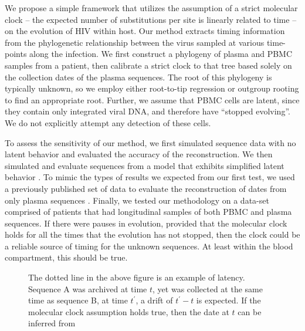 We propose a simple framework that utilizes the assumption of a strict molecular clock -- the expected number of substitutions per site is linearly related to time \citep{Ho14} --  on the evolution of HIV within host. Our method extracts timing information from the phylogenetic relationship between the virus sampled at various time-points along the infection. We first construct a phylogeny of plasma and PBMC samples from a patient, then calibrate a strict clock to that tree based solely on the collection dates of the plasma sequences. The root of this phylogeny is typically unknown, so we employ either root-to-tip regression or outgroup rooting to find an appropriate root. Further, we assume that PBMC cells are latent, since they contain only integrated viral DNA, and therefore have ``stopped evolving''. We do not explicitly attempt any detection of these cells. 

To assess the sensitivity of our method, we first simulated sequence data with no latent behavior and evaluated the accuracy of the reconstruction. We then simulated and evaluate sequences from a model that exhibits simplified latent behavior  \citep{Immonen14}. To mimic the types of results we expected from our first test, we used a previously published set of data to evaluate the reconstruction of dates from only plasma sequences \citep{McCloskey14}. Finally, we tested our methodology on a data-set comprised of patients that had longitudinal samples of both PBMC and plasma sequences.  If there were pauses in evolution, provided that the molecular clock holds for all the times that the evolution has not stopped, then the clock could be a reliable source of timing for the unknown sequences. At least within the blood compartment, this should be true. 

\begin{figure} \label{fig:latenttree}
	\centering
	\scalebox{5}{}
	\caption[Example of latent behavior]{The dotted line in the above figure is an example of latency. Sequence A was archived at time $t$, yet was collected at the same time as sequence B, at time $t^\prime$, a drift of $t^\prime - t$ is expected. If the molecular clock assumption holds true, then the date at $t$ can be inferred from }
\end{figure}
